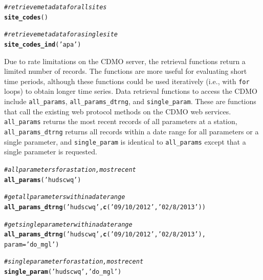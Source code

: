 \documentclass[10pt,letterpaper]{article}\usepackage[]{graphicx}\usepackage[]{color}
\makeatletter
\newcommand{\hlstr}[1]{\textcolor[rgb]{0.192,0.494,0.8}{#1}}%
\newcommand{\hlcom}[1]{\textcolor[rgb]{0.678,0.584,0.686}{\textit{#1}}}%
\newcommand{\hlstd}[1]{\textcolor[rgb]{0.345,0.345,0.345}{#1}}%
\newcommand{\hlkwc}[1]{\textcolor[rgb]{0.333,0.667,0.333}{#1}}%
\newcommand{\hlkwd}[1]{\textcolor[rgb]{0.737,0.353,0.396}{\textbf{#1}}}%
\newenvironment{kframe}{%
 \def\at@end@of@kframe{}%
 \ifinner\ifhmode%
  \def\at@end@of@kframe{\end{minipage}}%
  \begin{minipage}{\columnwidth}%
 \fi\fi%
 \def\FrameCommand##1{\hskip\@totalleftmargin \hskip-\fboxsep
 \colorbox{shadecolor}{##1}\hskip-\fboxsep
     \hskip-\linewidth \hskip-\@totalleftmargin \hskip\columnwidth}%
 \MakeFramed {\advance\hsize-\width
   \@totalleftmargin\z@ \linewidth\hsize
   \@setminipage}}%
 {\par\unskip\endMakeFramed%
 \at@end@of@kframe}
\newenvironment{knitrout}{}{} %
\makeatother
\begin{document}
\begin{knitrout}
\color{fgcolor}\begin{kframe}
\begin{alltt}
\hlcom{# retrieve metadata for all sites}
\hlkwd{site_codes}\hlstd{()}

\hlcom{# retrieve metadata for a single site}
\hlkwd{site_codes_ind}\hlstd{(}\hlstr{'apa'}\hlstd{)}
\end{alltt}
\end{kframe}
\end{knitrout}

Due to rate limitations on the \ac{CDMO} server, the retrieval functions return a limited number of records.  The functions are more useful for evaluating short time periods, although these functions could be used iteratively (i.e., with \texttt{for} loops) to obtain longer time series.  Data retrieval functions to access the \ac{CDMO} include \texttt{all\_params}, \texttt{all\_params\_dtrng}, and \texttt{single\_param}.  These are functions that call the existing web protocol methods on the CDMO web services.  \texttt{all\_params} returns the most recent records of all parameters at a station, \texttt{all\_params\_dtrng} returns all records within a date range for all parameters or a single parameter, and \texttt{single\_param} is identical to \texttt{all\_params} except that a single parameter is requested.    

\begin{knitrout}
\color{fgcolor}\begin{kframe}
\begin{alltt}
\hlcom{# all parameters for a station, most recent}
\hlkwd{all_params}\hlstd{(}\hlstr{'hudscwq'}\hlstd{)}

\hlcom{# get all parameters within a date range}
\hlkwd{all_params_dtrng}\hlstd{(}\hlstr{'hudscwq'}\hlstd{,} \hlkwd{c}\hlstd{(}\hlstr{'09/10/2012'}\hlstd{,} \hlstr{'02/8/2013'}\hlstd{))}

\hlcom{# get single parameter within a date range}
\hlkwd{all_params_dtrng}\hlstd{(}\hlstr{'hudscwq'}\hlstd{,} \hlkwd{c}\hlstd{(}\hlstr{'09/10/2012'}\hlstd{,} \hlstr{'02/8/2013'}\hlstd{),}
  \hlkwc{param} \hlstd{=} \hlstr{'do_mgl'}\hlstd{)}

\hlcom{# single parameter for a station, most recent}
\hlkwd{single_param}\hlstd{(}\hlstr{'hudscwq'}\hlstd{,} \hlstr{'do_mgl'}\hlstd{)}
\end{alltt}
\end{kframe}
\end{knitrout}
\end{document}
